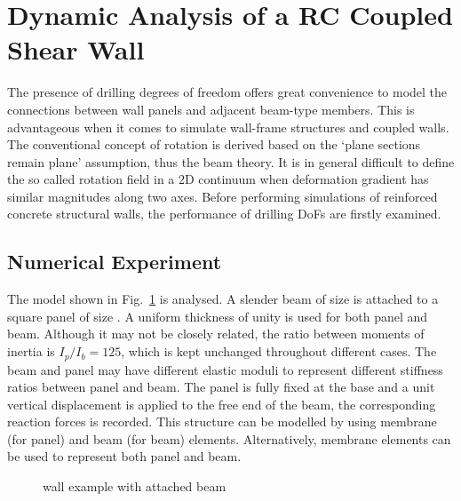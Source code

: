 \documentclass[3p,sort&compress,review,11pt,fleqn]{elsarticle}
\newcommand*{\figref}[1]{Fig.~\ref{#1}}
\begin{document}
\section{Dynamic Analysis of a RC Coupled Shear Wall}
The presence of drilling degrees of freedom offers great convenience to model the connections between wall panels and adjacent beam-type members. This is advantageous when it comes to simulate wall-frame structures and coupled walls. The conventional concept of rotation is derived based on the `plane sections remain plane' assumption, thus the beam theory. It is in general difficult to define the so called rotation field in a 2D continuum when deformation gradient has similar magnitudes along two axes. Before performing simulations of reinforced concrete structural walls, the performance of drilling DoFs are firstly examined.
\subsection{Numerical Experiment}
The model shown in \figref{fig:drilling_ex} is analysed. A slender beam of size  is attached to a square panel of size . A uniform thickness of unity is used for both panel and beam. Although it may not be closely related, the ratio between moments of inertia is $I_p/I_b=\num{125}$, which is kept unchanged throughout different cases. The beam and panel may have different elastic moduli to represent different stiffness ratios between panel and beam. The panel is fully fixed at the base and a unit vertical displacement is applied to the free end of the beam, the corresponding reaction forces is recorded. This structure can be modelled by using membrane (for panel) and beam (for beam) elements. Alternatively, membrane elements can be used to represent both panel and beam.
\begin{figure}[htb]
\centering\footnotesize
{}
\caption{wall example with attached beam}\label{fig:drilling_ex}
\end{figure}
\end{document}
